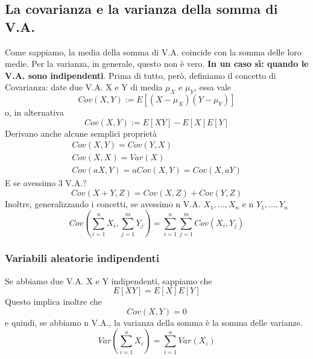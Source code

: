\documentclass[11pt]{article}
\begin{document}
\subsection{La covarianza e la varianza della somma di V.A.}
Come sappiamo, la media della somma di V.A. coincide con la somma delle loro medie. Per la varianza, in generale, questo non è vero. \textbf{In un caso sì: quando le V.A. sono indipendenti}. Prima di tutto, però, definiamo il concetto di Covarianza: date due V.A. X e Y di media $\mu_X$ e $\mu_Y$, essa vale
\begin{displaymath}
    Cov(X,Y) := E[(X-\mu_X)(Y-\mu_Y)]
\end{displaymath}
o, in alternativa
\begin{displaymath}
    Cov(X,Y) := E[XY] - E[X]E[Y]
\end{displaymath}
Derivano anche alcune semplici proprietà
\begin{gather*}
    Cov(X,Y)=Cov(Y,X)\\ 
    Cov(X,X)=Var(X)\\ 
    Cov(aX,Y)=aCov(X,Y)=Cov(X,aY)
\end{gather*}
E se avessimo 3 V.A.?
\begin{displaymath}
    Cov(X+Y,Z) = Cov(X,Z)+Cov(Y,Z)
\end{displaymath}
Inoltre, generalizzando i concetti, se avessimo n V.A. $X_1,...,X_n$ e n $Y_1,...,Y_n$
\begin{displaymath}
    Cov\left(\sum_{i=1}^nX_i,\sum_{j=1}^mY_j\right) = \sum_{i=1}^n\sum_{j=1}^m Cov(X_i,Y_j)
\end{displaymath}
\subsubsection{Variabili aleatorie indipendenti}
Se abbiamo due V.A. X e Y indipendenti, sappiamo che
\begin{displaymath}
    E[XY] = E[X]E[Y]
\end{displaymath}
Questo implica inoltre che
\begin{displaymath}
    Cov(X,Y) = 0
\end{displaymath}
e quindi, se abbiamo n V.A., la varianza della somma è la somma delle varianze.
\begin{displaymath}
    Var(\sum_{i=1}^n X_i) = \sum_{i=1}^n Var(X_i)
\end{displaymath}
\end{document}
